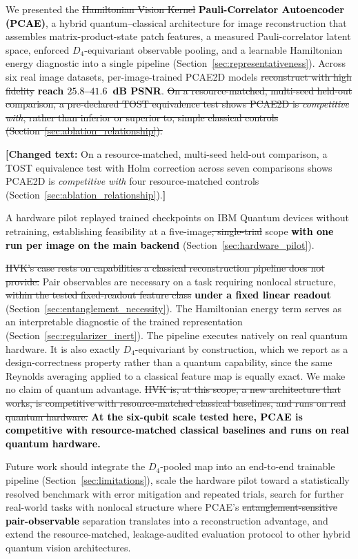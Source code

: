 \documentclass[pdflatex,sn-basic]{sn-jnl}
\newcommand{\del}[1]{\sout{#1}}
\newcommand{\add}[1]{\textbf{\textcolor{black}{#1}}}
\newcommand{\yellowchange}[1]{%
  \par\smallskip\noindent
  \begingroup\setlength{\fboxsep}{3pt}%
  \colorbox{yellow!35}{\parbox{\dimexpr\linewidth-2\fboxsep\relax}{\textbf{[Changed text:} #1\textbf{]}}}%
  \endgroup\par\smallskip}
\begin{document}
We presented the \del{Hamiltonian Vision Kernel} \add{Pauli-Correlator Autoencoder (PCAE)}, a hybrid quantum--classical
architecture for image reconstruction that assembles matrix-product-state patch
features, a measured Pauli-correlator latent space, enforced $D_4$-equivariant
observable pooling, and a learnable Hamiltonian energy diagnostic into a single
pipeline (Section~\ref{sec:representativeness}). Across six real image datasets,
per-image-trained PCAE2D models \del{reconstruct with high fidelity}
\add{reach $25.8$--$41.6$~dB PSNR}.
\del{On a resource-matched, multi-seed held-out comparison, a pre-declared TOST
equivalence test shows PCAE2D is \emph{competitive with}, rather than inferior
or superior to, simple classical controls (Section~\ref{sec:ablation_relationship}).}
\yellowchange{On a resource-matched, multi-seed held-out comparison, a TOST
equivalence test with Holm correction across seven comparisons shows PCAE2D is
\emph{competitive with} four resource-matched controls
(Section~\ref{sec:ablation_relationship}).}
A hardware pilot replayed trained checkpoints on IBM Quantum devices without
retraining, establishing feasibility at a five-image\del{, single-trial} scope
\add{with one run per image on the main backend}
(Section~\ref{sec:hardware_pilot}).

\del{HVK’s case rests on capabilities a classical reconstruction pipeline does not
provide.} Pair observables are necessary on a task requiring nonlocal structure,
\del{within the tested fixed-readout feature class} \add{under a fixed linear
readout} (Section~\ref{sec:entanglement_necessity}). The Hamiltonian energy term
serves as an interpretable diagnostic of the trained representation
(Section~\ref{sec:regularizer_inert}). The pipeline executes natively on real
quantum hardware. It is also exactly $D_4$-equivariant by construction, which we
report as a design-correctness property rather than a quantum capability, since
the same Reynolds averaging applied to a classical feature map is equally exact.
We make no claim of quantum advantage. \del{HVK is, at this scope, a new architecture
that works, is competitive with resource-matched classical baselines, and runs on
real quantum hardware.} \add{At the six-qubit scale tested here, PCAE is
competitive with resource-matched classical baselines and runs on real quantum
hardware.}

Future work should integrate the $D_4$-pooled map into an end-to-end trainable
pipeline (Section~\ref{sec:limitations}), scale the hardware pilot toward a
statistically resolved benchmark with error mitigation and repeated trials,
search for further real-world tasks with nonlocal structure where PCAE's
\del{entanglement-sensitive} \add{pair-observable} separation translates into a reconstruction advantage, and
extend the resource-matched, leakage-audited evaluation protocol to other hybrid
quantum vision architectures.
\end{document}
